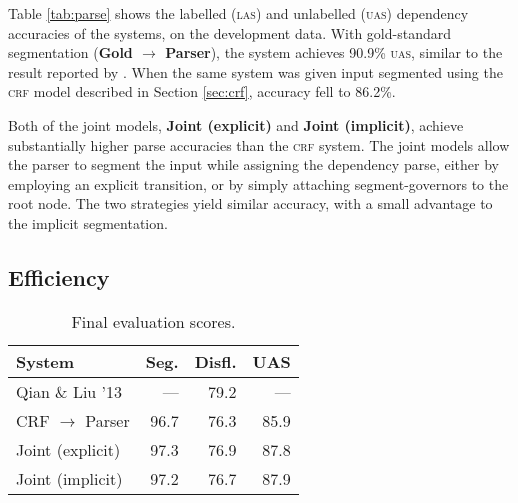 \documentclass[11pt,letterpaper]{article}
\begin{document}
Table \ref{tab:parse} shows the labelled (\textsc{las}) and unlabelled (\textsc{uas})
dependency accuracies of the systems, on the development data.  With gold-standard
segmentation (\textbf{Gold $\rightarrow$ Parser}), the system achieves 90.9\%
\textsc{uas}, similar to the result reported by \citet{honnibal:14}.  When
the same system was given input segmented using the \textsc{crf} model described
in Section \ref{sec:crf}, accuracy fell to 86.2\%.

Both of the joint models, \textbf{Joint (explicit)} and \textbf{Joint (implicit)},
achieve substantially higher parse accuracies than the \textsc{crf} system.
The joint models allow the parser to segment the input while assigning the
dependency parse, either by employing an explicit transition, or by simply
attaching segment-governors to the root node.  The two strategies yield similar
accuracy, with a small advantage to the implicit segmentation.

\subsection{Efficiency}

%
%
%
%
\begin{table}
    \centering
    \small
    \begin{tabular}{l|rrr}
        \hline
        System & Seg. & Disfl. & UAS \\
        \hline \hline
        Qian \& Liu '13          & ---  & 79.2 & --- \\
        CRF $\rightarrow$ Parser & 96.7 & 76.3 & 85.9 \\
        Joint (explicit)         & 97.3 & 76.9 & 87.8 \\
        Joint (implicit)         & 97.2 & 76.7 & 87.9 \\
        \hline
    \end{tabular}
    \caption{\small Final evaluation scores.}
\end{table}
\end{document}
